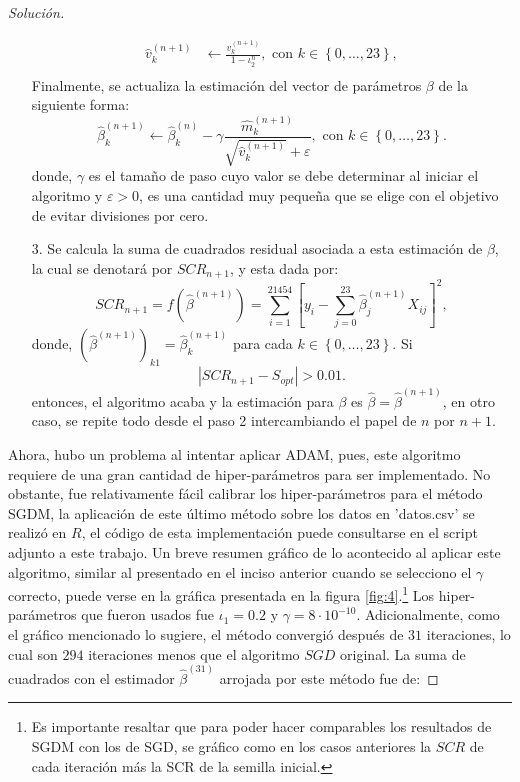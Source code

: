 \documentclass[10.5pt,notitlepage]{article}
\newenvironment{solucion}
  {\begin{proof}[Solución]}
  {\end{proof}}
\newcommand{\ee}{\varepsilon}
\newcommand{\abs}[1]{\left\lvert #1 \right\rvert}
\newcommand{\corch}[1]{\left[ #1 \right]}
\newcommand{\kis}[1]{\left\{ #1 \right\}}
\theoremstyle{plain}
\begin{document}
\begin{solucion}
\begin{itemize}
\begin{align*}
       \hat{v}_{k}^{(n+1)} &\leftarrow  \frac{v_k^{(n+1)}}{1 - \iota_{2}^n}, \text{ con } k \in \kis{0, \hdots,23},\\            
    \end{align*}    
    Finalmente, se actualiza la estimación del vector de parámetros \(\beta\) de la siguiente forma:
    \[
      \hat{\beta}_{k}^{(n+1)} \leftarrow \hat{\beta}_{k}^{(n)} - \gamma \frac{\hat{m}_{k}^{(n+1)}}{\sqrt{\hat{v}_{k}^{(n+1)}} + \ee}, \text{ con } k \in \kis{0, \hdots,23}.
    \]
    donde, \(\gamma\) es el tamaño de paso cuyo valor se debe determinar al iniciar el algoritmo y \(\ee > 0\), es una cantidad muy pequeña que se elige con el objetivo de evitar divisiones por cero.
    \item[3.] Se calcula la suma de cuadrados residual asociada a esta estimación de \(\beta\), la cual se denotará por \(SCR_{n+1}\), y esta dada por:
    \[
    SCR_{n+1} = f(\hat{\beta}^{(n+1)}) = \sum_{i = 1}^{21454}\corch{y_i - \sum_{j = 0}^{23}\hat{\beta}_{j}^{(n+1)}X_{ij} }^2,
    \]
    donde, \((\hat{\beta}^{(n+1)})_{k1} =  \hat{\beta}_{k}^{(n+1)}\) para cada \(k\in \kis{0,\hdots,23}\). Si 
    \[
    \abs{SCR_{n+1} - S_{opt}} > 0.01.
    \]
    entonces, el algoritmo acaba y la estimación para \(\beta\) es \( \hat{\beta} =\hat{\beta}^{(n+1)}\), en otro caso, se repite todo desde el paso 2 intercambiando el papel de \(n\) por \(n+1\).
\end{itemize}
Ahora, hubo un problema al intentar aplicar ADAM, pues, este algoritmo requiere de una gran cantidad de hiper-parámetros para ser implementado. No obstante, fue relativamente fácil calibrar los hiper-parámetros para el método SGDM, la aplicación de este último método sobre los datos en 'datos.csv' se realizó en \(R\), el código de esta implementación puede consultarse en el script adjunto a este trabajo. Un breve resumen gráfico de lo acontecido al aplicar este algoritmo, similar al presentado en el inciso anterior cuando se selecciono el \(\gamma\) correcto, puede verse en la gráfica presentada en la figura \ref{fig:4}.\footnote{Es importante resaltar que para poder hacer comparables los resultados de SGDM con los de SGD, se gráfico como en los casos anteriores la \(SCR\) de cada iteración más la SCR de la semilla inicial.} Los hiper-parámetros que fueron usados fue \(\iota_1 = 0.2\) y \(\gamma = 8\cdot 10^{-10}\). Adicionalmente, como el gráfico mencionado lo sugiere, el método convergió después de \(31\) iteraciones, lo cual son \(294\) iteraciones menos que el algoritmo \(SGD\) original. La suma de cuadrados con el estimador \(\hat{\beta}^{(31)}\) arrojada por este método fue de:

\end{solucion}
\end{document}
